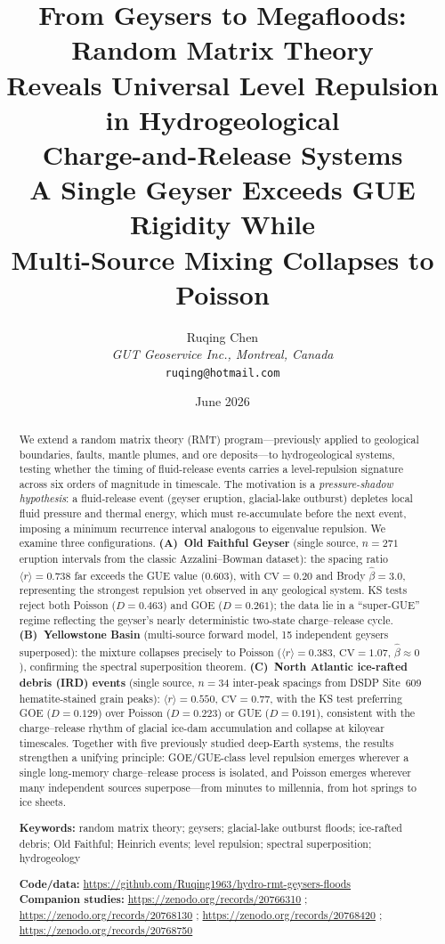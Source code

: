 \documentclass[12pt,a4paper]{article}
\title{\textbf{From Geysers to Megafloods: Random Matrix Theory\\
Reveals Universal Level Repulsion in Hydrogeological\\
Charge-and-Release Systems}\\[4pt]
\large A Single Geyser Exceeds GUE Rigidity While\\
Multi-Source Mixing Collapses to Poisson}
\author{Ruqing Chen\\
\textit{GUT Geoservice Inc., Montreal, Canada}\\
\texttt{ruqing@hotmail.com}}
\date{June 2026}
\begin{document}
\maketitle

\begin{abstract}
We extend a random matrix theory (RMT) program---previously applied to geological boundaries, faults, mantle plumes, and ore deposits---to hydrogeological systems, testing whether the timing of fluid-release events carries a level-repulsion signature across six orders of magnitude in timescale. The motivation is a \emph{pressure-shadow hypothesis}: a fluid-release event (geyser eruption, glacial-lake outburst) depletes local fluid pressure and thermal energy, which must re-accumulate before the next event, imposing a minimum recurrence interval analogous to eigenvalue repulsion. We examine three configurations. \textbf{(A)~Old Faithful Geyser} (single source, $n=271$ eruption intervals from the classic Azzalini--Bowman dataset): the spacing ratio $\langle r\rangle=0.738$ far exceeds the GUE value (0.603), with $\mathrm{CV}=0.20$ and Brody $\hat\beta=3.0$, representing the strongest repulsion yet observed in any geological system. KS tests reject both Poisson ($D=0.463$) and GOE ($D=0.261$); the data lie in a ``super-GUE'' regime reflecting the geyser's nearly deterministic two-state charge--release cycle. \textbf{(B)~Yellowstone Basin} (multi-source forward model, 15 independent geysers superposed): the mixture collapses precisely to Poisson ($\langle r\rangle=0.383$, $\mathrm{CV}=1.07$, $\hat\beta\approx0$), confirming the spectral superposition theorem. \textbf{(C)~North Atlantic ice-rafted debris (IRD) events} (single source, $n=34$ inter-peak spacings from DSDP Site~609 hematite-stained grain peaks): $\langle r\rangle=0.550$, $\mathrm{CV}=0.77$, with the KS test preferring GOE ($D=0.129$) over Poisson ($D=0.223$) or GUE ($D=0.191$), consistent with the charge--release rhythm of glacial ice-dam accumulation and collapse at kiloyear timescales. Together with five previously studied deep-Earth systems, the results strengthen a unifying principle: GOE/GUE-class level repulsion emerges wherever a single long-memory charge--release process is isolated, and Poisson emerges wherever many independent sources superpose---from minutes to millennia, from hot springs to ice sheets.

\medskip
\noindent\textbf{Keywords:} random matrix theory; geysers; glacial-lake outburst floods; ice-rafted debris; Old Faithful; Heinrich events; level repulsion; spectral superposition; hydrogeology

\medskip
\noindent\textbf{Code/data:} \url{https://github.com/Ruqing1963/hydro-rmt-geysers-floods}\\
\textbf{Companion studies:} \url{https://zenodo.org/records/20766310} ; \url{https://zenodo.org/records/20768130} ; \url{https://zenodo.org/records/20768420} ; \url{https://zenodo.org/records/20768750}
\end{abstract}
\end{document}

